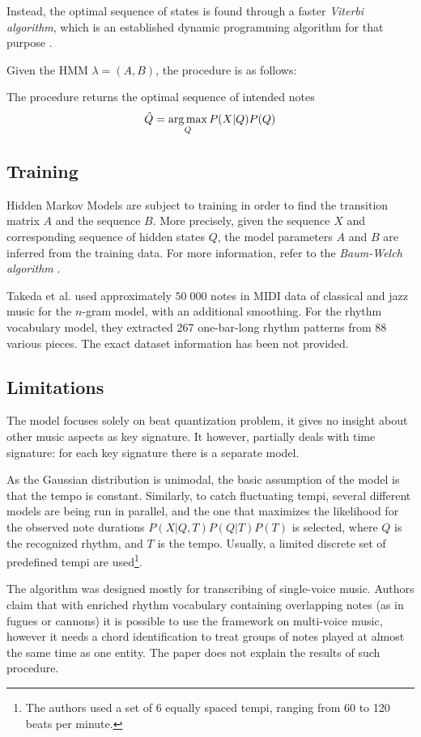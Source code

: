 Instead, the optimal sequence of states is found through a faster \emph{Viterbi algorithm}, which is an established dynamic programming algorithm for that purpose \cite[p.210--220]{Jurafsky2009}. 

Given the HMM $\lambda = (A, B)$, the procedure is as follows:



The procedure returns the optimal sequence of intended notes $$\hat{Q} = \argmax_Q P(X|Q)P(Q)$$

\subsection{Training}

Hidden Markov Models are subject to training in order to find the transition matrix $A$ and the sequence $B$. More precisely, given the sequence $X$ and corresponding sequence of hidden states $Q$, the model parameters $A$ and $B$ are inferred from the training data. For more information, refer to the \emph{Baum-Welch algorithm} \cite[p. 220--226]{Jurafsky2009}.

Takeda et al. used approximately $50\;000$ notes in MIDI data of classical and jazz music for the $n$-gram model, with an additional smoothing. For the rhythm vocabulary model, they extracted 267 one-bar-long rhythm patterns from 88 various pieces. The exact dataset information has been not provided.

\subsection{Limitations}

The model focuses solely on beat quantization problem, it gives no insight about other music aspects as key signature. It however, partially deals with time signature: for each key signature there is a separate model.

As the Gaussian distribution is unimodal, the basic assumption of the model is that the tempo is constant. Similarly, to catch fluctuating tempi, several different models are being run in parallel, and the one that maximizes the likelihood for the observed note durations $P(X|Q,T)P(Q|T)P(T)$ is selected, where $Q$ is the recognized rhythm, and $T$ is the tempo. Usually, a limited discrete set of predefined tempi are used\footnote{The authors used a set of 6 equally spaced tempi, ranging from 60 to 120 beats per minute.}.

The algorithm was designed mostly for transcribing of single-voice music. Authors claim that with enriched rhythm vocabulary containing overlapping notes (as in fugues or cannons) it is possible to use the framework on multi-voice music, however it needs a chord identification to treat groups of notes played at almost the same time as one entity. The paper does not explain the results of such procedure.

